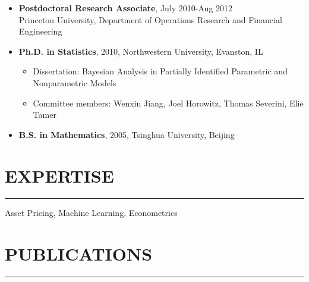 \documentclass[11pt]{article}
\begin{document}
\hfill
\begin{itemize}
\item \textbf{Postdoctoral Research Associate}, July 2010-Aug 2012\\
Princeton University, Department of Operations Research and
Financial Engineering%
  \item \textbf{Ph.D. in Statistics}, 2010, Northwestern University, Evanston, IL
  \begin{itemize}
\item Dissertation:  Bayesian Analysis in Partially Identified Parametric and Nonparametric Models
\item  Committee members:  Wenxin Jiang,  Joel Horowitz, Thomas  Severini,  Elie Tamer
\end{itemize}
   \item \textbf{B.S. in Mathematics}, 2005, Tsinghua University, Beijing
\end{itemize}



\section*{EXPERTISE}
\hrule

\hfill




Asset Pricing, Machine Learning, Econometrics


 


\section*{PUBLICATIONS}
\hrule
\hfill

 
 
 \medskip
 
  
  
\end{document}
